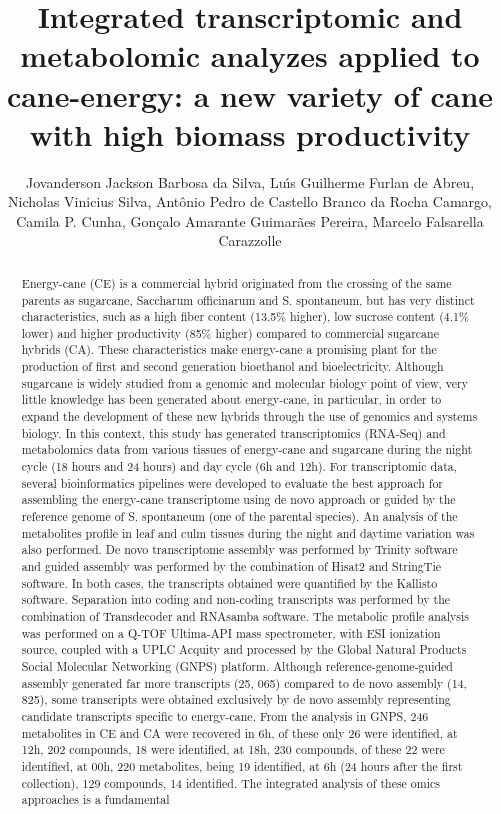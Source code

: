 \documentclass[twoside]{article}
\title{\vspace{-15mm}\fontsize{24pt}{10pt}\selectfont\textbf{ Integrated transcriptomic and metabolomic analyzes applied to cane-energy: a new variety of cane with high biomass productivity }} %
\author{ Jovanderson Jackson Barbosa da Silva, Lu\'{\i}s Guilherme Furlan de Abreu, Nicholas Vinicius Silva, Ant\^onio Pedro de Castello Branco da Rocha Camargo, Camila P. Cunha, Gon\c{c}alo Amarante Guimar\~aes Pereira, Marcelo Falsarella Carazzolle }
\affil{ Universidade Estadual de Campinas }
\date{}
\begin{document}
  
  
  \maketitle %
  
  
  \thispagestyle{fancy} %
  
  
  \begin{abstract}
  Energy-cane (CE) is a commercial hybrid originated from the crossing of the same parents as sugarcane,  Saccharum officinarum and S. spontaneum,  but has very distinct characteristics,  such as a high fiber content (13.5\% higher),  low sucrose content (4.1\% lower) and higher productivity (85\% higher) compared to commercial sugarcane hybrids (CA). These characteristics make energy-cane a promising plant for the production of first and second generation bioethanol and bioelectricity. Although sugarcane is widely studied from a genomic and molecular biology point of view,  very little knowledge has been generated about energy-cane,  in particular,  in order to expand the development of these new hybrids through the use of genomics and systems biology. In this context,  this study has generated transcriptomics (RNA-Seq) and metabolomics data from various tissues of energy-cane and sugarcane during the night cycle (18 hours and 24 hours) and day cycle (6h and 12h). For transcriptomic data,  several bioinformatics pipelines were developed to evaluate the best approach for assembling the energy-cane transcriptome using de novo approach or guided by the reference genome of S. spontaneum (one of the parental species). An analysis of the metabolites profile in leaf and culm tissues during the night and daytime variation was also performed. De novo transcriptome assembly was performed by Trinity software and guided assembly was performed by the combination of Hisat2 and StringTie software. In both cases,  the transcripts obtained were quantified by the Kallisto software. Separation into coding and non-coding transcripts was performed by the combination of Transdecoder and RNAsamba software. The metabolic profile analysis was performed on a Q-TOF Ultima-API mass spectrometer,  with ESI ionization source,  coupled with a UPLC Acquity and processed by the Global Natural Products Social Molecular Networking (GNPS) platform. Although reference-genome-guided assembly generated far more transcripts (25, 065) compared to de novo assembly (14, 825),  some transcripts were obtained exclusively by de novo assembly representing candidate transcripts specific to energy-cane. From the analysis in GNPS,  246 metabolites in CE and CA were recovered in 6h,  of these only 26 were identified,  at 12h,  202 compounds,  18 were identified,  at 18h,  230 compounds,  of these 22 were identified,  at 00h,  220 metabolites,  being 19 identified,  at 6h (24 hours after the first collection),  129 compounds,  14 identified.  The integrated analysis of these omics approaches is a fundamental 
\end{abstract}
\end{document}
